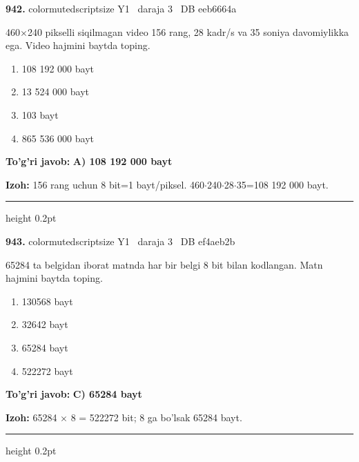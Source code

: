 \documentclass[10pt,a4paper,oneside]{article}
\begin{document}
\noindent\textbf{\color{ink}942.}  {color{muted}scriptsize Y1 \textbullet\ daraja 3 \textbullet\ DB eeb6664a}
\par
460\ensuremath{\times}240 pikselli siqilmagan video 156 rang, 28 kadr/s va 35 soniya davomiylikka ega. Video hajmini baytda toping.
\begin{enumerate}[label=\Alph*),leftmargin=9mm]
\item 108 192 000 bayt
\item 13 524 000 bayt
\item 103 bayt
\item 865 536 000 bayt
\end{enumerate}
\begin{tcolorbox}[enhanced,breakable,colback=teal!4,colframe=teal!50!black,boxrule=0.5pt,arc=1.1mm,left=3mm,right=3mm,top=1.7mm,bottom=1.7mm,before skip=2mm,after skip=2mm]
\textbf{\color{teal}To'g'ri javob:} \textbf{A) 108 192 000 bayt}
\par\smallskip
\textbf{Izoh:} 156 rang uchun 8 bit=1 bayt/piksel. 460\ensuremath{\cdot}240\ensuremath{\cdot}28\ensuremath{\cdot}35=108 192 000 bayt.
\end{tcolorbox}
\vspace{2mm}\hrule height 0.2pt \vspace{3mm}

\noindent\textbf{\color{ink}943.}  {color{muted}scriptsize Y1 \textbullet\ daraja 3 \textbullet\ DB ef4aeb2b}
\par
65284 ta belgidan iborat matnda har bir belgi 8 bit bilan kodlangan. Matn hajmini baytda toping.
\begin{enumerate}[label=\Alph*),leftmargin=9mm]
\item 130568 bayt
\item 32642 bayt
\item 65284 bayt
\item 522272 bayt
\end{enumerate}
\begin{tcolorbox}[enhanced,breakable,colback=teal!4,colframe=teal!50!black,boxrule=0.5pt,arc=1.1mm,left=3mm,right=3mm,top=1.7mm,bottom=1.7mm,before skip=2mm,after skip=2mm]
\textbf{\color{teal}To'g'ri javob:} \textbf{C) 65284 bayt}
\par\smallskip
\textbf{Izoh:} 65284 \ensuremath{\times} 8 = 522272 bit; 8 ga bo'lsak 65284 bayt.
\end{tcolorbox}
\vspace{2mm}\hrule height 0.2pt \vspace{3mm}
\end{document}
